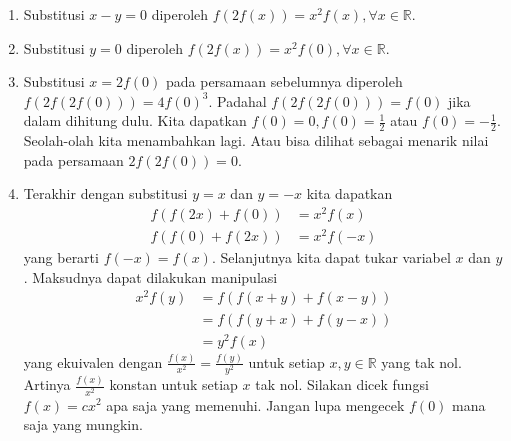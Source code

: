 \documentclass{article}
\begin{document}
\begin{enumerate}
\item Substitusi $x-y = 0$ diperoleh $f(2f(x)) = x^2 f(x), \forall x \in \mathbb{R}$.
\item Substitusi $y = 0$ diperoleh $f(2f(x)) = x^2 f(0), \forall x \in \mathbb{R}$.
\item Substitusi $x = 2f(0)$ pada persamaan sebelumnya diperoleh $f(2f(2f(0))) = 4f(0)^3$. Padahal $f(2f(2f(0))) = f(0)$ jika dalam dihitung dulu. Kita dapatkan $f(0) = 0, f(0) = \frac{1}{2}$ atau $f(0) = -\frac{1}{2}$. Seolah-olah kita menambahkan lagi. Atau bisa dilihat sebagai menarik nilai pada persamaan $2f(2f(0)) = 0$.
\item Terakhir dengan substitusi $y = x$ dan $y = -x$ kita dapatkan
\begin{align*}
f(f(2x)+f(0)) &= x^2 f(x) \\
f(f(0)+f(2x)) &= x^2 f(-x)
\end{align*}
yang berarti $f(-x) = f(x)$. Selanjutnya kita dapat tukar variabel $x$ dan $y$. Maksudnya dapat dilakukan manipulasi
\begin{align*}
x^2 f(y) &= f(f(x+y)+f(x-y)) \\
&= f(f(y+x)+f(y-x)) \\
&= y^2 f(x)
\end{align*}
yang ekuivalen dengan $\frac{f(x)}{x^2} = \frac{f(y)}{y^2}$ untuk setiap $x, y \in \mathbb{R}$ yang tak nol. Artinya $\frac{f(x)}{x^2}$ konstan untuk setiap $x$ tak nol. Silakan dicek fungsi $f(x) = c x^2$ apa saja yang memenuhi. Jangan lupa mengecek $f(0)$ mana saja yang mungkin.
\end{enumerate}
\end{document}
